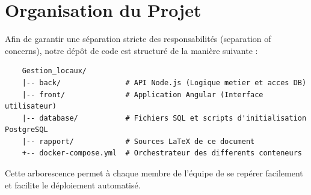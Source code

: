 \section{Organisation du Projet}
Afin de garantir une séparation stricte des responsabilités (separation of concerns), notre dépôt de code est structuré de la manière suivante :

\begin{verbatim}
    Gestion_locaux/
    |-- back/               # API Node.js (Logique metier et acces DB)
    |-- front/              # Application Angular (Interface utilisateur)
    |-- database/           # Fichiers SQL et scripts d'initialisation PostgreSQL
    |-- rapport/            # Sources LaTeX de ce document
    +-- docker-compose.yml  # Orchestrateur des differents conteneurs
\end{verbatim}

Cette arborescence permet à chaque membre de l'équipe de se repérer facilement et facilite le déploiement automatisé.